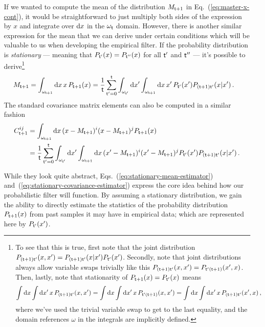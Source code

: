 If we wanted to compute the mean of the distribution $M_{{\sf t}+1}$ in Eq.~(\ref{eq:master-x-cont}), it would be straightforward to just multiply both sides of the expression by $x$ and integrate over ${\rm d}x$ in the $\omega_{{\sf t}}$ domain. However, there is another similar expression for the mean that we can derive under certain conditions which will be valuable to us when developing the empirical filter. If the probability distribution is \emph{stationary} --- meaning that $P_{{\sf t}'}(x)=P_{{\sf t}''}(x)$ for all ${\sf t}'$ and ${\sf t}''$ --- it's possible to derive\footnote{To see that this is true, first note that the joint distribution $P_{({\sf t}+1){\sf t}'}(x,x')=P_{({\sf t}+1){\sf t}'}(x\vert x')P_{{\sf t}'}(x')$. Secondly, note that joint distributions always allow variable swaps trivially like this $P_{({\sf t}+1){\sf t}'}(x,x')=P_{{\sf t}'({\sf t}+1)}(x',x)$. Then, lastly, note that stationarity of $P_{{\sf t}+1}(x)=P_{{\sf t}'}(x)$ means 
$$\int {\rm d}x\int {\rm d}x' \, x\,P_{({\sf t}+1){\sf t}'}(x,x')=\int {\rm d}x\int {\rm d}x'  \, x\, P_{{\sf t}'({\sf t}+1)}(x,x')=\int {\rm d}x\int {\rm d}x'  \, x\, P_{({\sf t}+1){\sf t}'}(x',x)\,,$$
where we've used the trivial variable swap to get to the last equality, and the domain references $\omega$ in the integrals are implicitly defined.} 
\begin{align}
M_{{\sf t}+1} = \int_{\omega_{{\sf t}+1}}{\rm d}x \,x\,P_{{\sf t}+1}(x) &= \frac{1}{{\sf t}}\sum_{{\sf t}'=0}^{{\sf t}}\int_{\omega_{{\sf t}'}}{\rm d}x'\int_{\omega_{{\sf t}+1}}{\rm d}x \, x' \, P_{{\sf t}'}(x') P_{({\sf t}+1){\sf t}'}(x\vert x') \label{eq:stationary-mean-estimator}\,.
\end{align}
The standard covariance matrix elements can also be computed in a similar fashion
\begin{align}
C^{ij}_{{\sf t}+1} &= \int_{\omega_{{\sf t}+1}}{\rm d}x \,(x-M_{{\sf t}+1})^i(x-M_{{\sf t}+1})^jP_{{\sf t}+1}(x) \nonumber \\
&= \frac{1}{{\sf t}}\sum_{{\sf t}'=0}^{{\sf t}}\int_{\omega_{{\sf t}'}}{\rm d}x'\int_{\omega_{{\sf t}+1}}{\rm d}x \, (x'-M_{{\sf t}+1})^i(x'-M_{{\sf t}+1})^j P_{{\sf t}'}(x') P_{({\sf t}+1){\sf t}'}(x\vert x') \label{eq:stationary-covariance-estimator}\,.
\end{align}

While they look quite abstract, Eqs.~(\ref{eq:stationary-mean-estimator}) and~(\ref{eq:stationary-covariance-estimator}) express the core idea behind how our probabilistic filter will function. By assuming a stationary distribution, we gain the ability to directly estimate the statistics of the probability distribution $P_{{\sf t}+1}(x)$ from past samples it may have in empirical data; which are represented here by $P_{{\sf t}'}(x')$.

